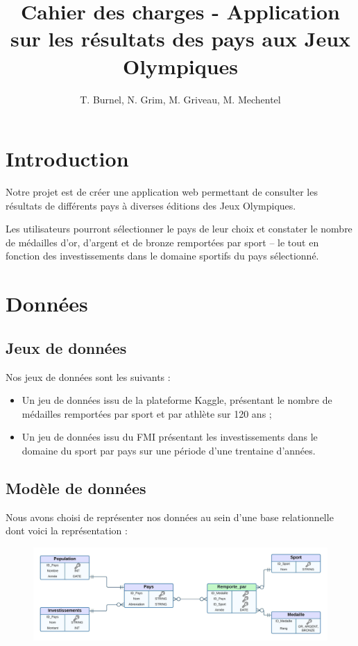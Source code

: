 \documentclass[12pt]{article}
\title{Cahier des charges - Application sur les résultats des pays aux Jeux Olympiques}
\date{}
\author{T. Burnel, N. Grim, M. Griveau, M. Mechentel}
\begin{document}
	\maketitle
	\tableofcontents
	
	\section{Introduction}
	
	Notre projet est de créer une application web permettant de consulter les résultats de différents pays à diverses éditions des Jeux Olympiques.
	
	Les utilisateurs pourront sélectionner le pays de leur choix et constater le nombre de médailles d'or, d'argent et de bronze remportées par sport -- le tout en fonction des investissements dans le domaine sportifs du pays sélectionné.
	
	\section{Données}
	
	\subsection{Jeux de données}
	
	Nos jeux de données sont les suivants :
	
	\begin{itemize}
		\item Un jeu de données issu de la plateforme Kaggle, présentant le nombre de médailles remportées par sport et par athlète sur 120 ans ;
		\item Un jeu de données issu du FMI présentant les investissements dans le domaine du sport par pays sur une période d’une trentaine d’années.
	\end{itemize}

	\subsection{Modèle de données}
	
	Nous avons choisi de représenter nos données au sein d'une base relationnelle dont voici la représentation :
	
	\begin{center}
		\begin{figure}[H]
			\includegraphics[scale=0.5]{modele01.jpeg}
		\end{figure}
	\end{center}
\end{document}
